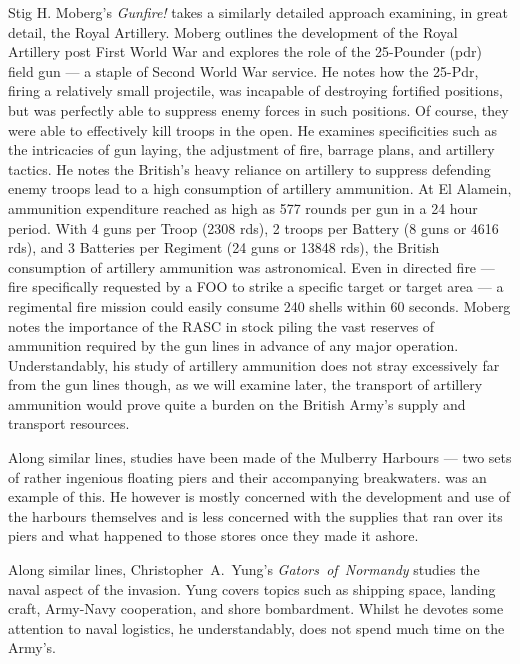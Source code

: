 \documentclass[noraggedright]{turabian-researchpaper}
\begin{document}
Stig H. Moberg's \textit{Gunfire!} takes a similarly detailed approach 
examining, in great detail, the Royal 
Artillery.  Moberg outlines the development of the Royal Artillery post First 
World War and explores the role of the 25-Pounder (pdr) field gun --- a 
staple of Second World War service.\autocite[See Chapters 1 --3][]{gunfire} 
He notes how the 25-Pdr, firing a relatively small projectile, was incapable 
of destroying fortified positions, but was perfectly able to suppress enemy 
forces in such positions. Of course, they were able to effectively kill 
troops in the open.\autocite [273]{gunfire} He examines specificities such as 
the intricacies of gun laying, the adjustment of fire, barrage plans, and 
artillery tactics. %
He notes the British's heavy reliance on artillery to 
suppress defending enemy troops lead to a high consumption of artillery 
ammunition.  At El Alamein, ammunition expenditure reached as high as 577 
rounds per gun in a 24 hour period.\autocite[256]{gunfire} With 4 guns per 
Troop (2308 rds), 2 troops per Battery (8 guns or 4616 rds), and 3 Batteries 
per Regiment (24 guns or 13848 rds), 
the British consumption of artillery ammunition was astronomical.\autocite[69]
{gunfire} Even in directed fire --- fire specifically requested by a FOO to 
strike a specific target or target area --- a regimental fire mission could 
easily consume 240 shells within 60 seconds.\autocite[133]{gunfire} 
Moberg notes the importance of the RASC in stock piling the vast reserves of 
ammunition required by the gun lines in advance of any major 
operation.\autocite[125]{gunfire} Understandably, his study of artillery 
ammunition does not stray excessively far from the gun lines though, as we 
will examine later, the transport of artillery ammunition would prove quite a 
burden on the British Army's supply and transport resources.


Along similar lines, studies have been made of the Mulberry Harbours --- two
sets of rather ingenious floating piers and their accompanying breakwaters.  
was an example of this.  He however is mostly concerned with the development
and use of the harbours themselves and is less concerned with the supplies that
ran over its piers and what happened to those stores once they made it ashore.

Along similar lines, \mbox{Christopher A. Yung's} \mbox{\textit{Gators of 
Normandy}} studies the naval aspect of the invasion.  Yung covers topics such
as shipping space, landing craft, Army-Navy cooperation, and shore 
bombardment. %
Whilst he devotes some attention to naval logistics, he understandably, does 
not spend much time on the Army's.  
\end{document}
